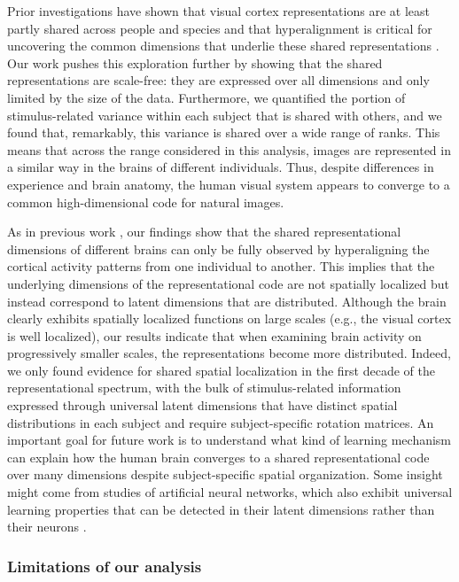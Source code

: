 \documentclass[10pt]{article}
\begin{document}
Prior investigations have shown that visual cortex representations are
at least partly shared across people and species
\autocite{Haxby2011,Kriegeskorte2008} and that hyperalignment is
critical for uncovering the common dimensions that underlie these shared
representations \autocite{Haxby2011,Haxby2020}. Our work pushes this
exploration further by showing that the shared representations are
scale-free: they are expressed over all dimensions and only limited by
the size of the data. Furthermore, we quantified the portion of
stimulus-related variance within each subject that is shared with
others, and we found that, remarkably, this variance is shared over a
wide range of ranks. This means that across the range considered in this
analysis, images are represented in a similar way in the brains of
different individuals. Thus, despite differences in experience and brain
anatomy, the human visual system appears to converge to a common
high-dimensional code for natural images.

As in previous work \autocite{Haxby2011}, our findings show that the
shared representational dimensions of different brains can only be fully
observed by hyperaligning the cortical activity patterns from one
individual to another. This implies that the underlying dimensions of
the representational code are not spatially localized but instead
correspond to latent dimensions that are distributed. Although the brain
clearly exhibits spatially localized functions on large scales (e.g.,
the visual cortex is well localized), our results indicate that when
examining brain activity on progressively smaller scales, the
representations become more distributed. Indeed, we only found evidence
for shared spatial localization in the first decade of the
representational spectrum, with the bulk of stimulus-related information
expressed through universal latent dimensions that have distinct spatial
distributions in each subject and require subject-specific rotation
matrices. An important goal for future work is to understand what kind
of learning mechanism can explain how the human brain converges to a
shared representational code over many dimensions despite
subject-specific spatial organization. Some insight might come from
studies of artificial neural networks, which also exhibit universal
learning properties that can be detected in their latent dimensions
rather than their neurons \autocites[e.g.][]{Guth2024,Chen2024}.

\subsubsection{Limitations of our
analysis}\label{limitations-of-our-analysis}
\end{document}
